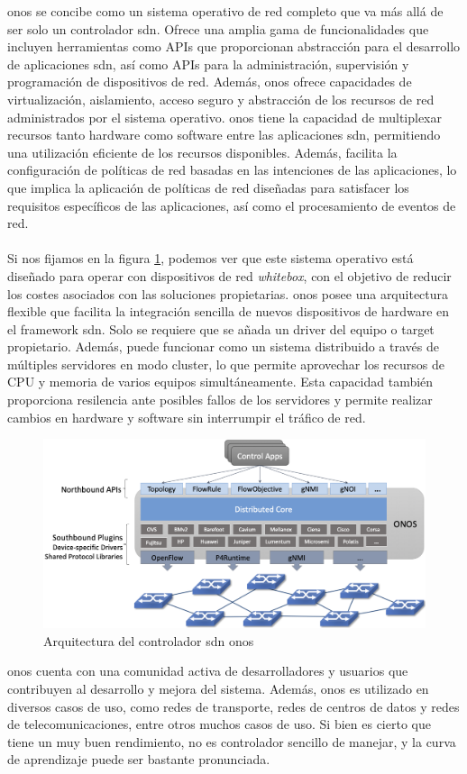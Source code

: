 \gls{onos} se concibe como un sistema operativo de red completo que va más allá de ser solo un controlador \gls{sdn}. Ofrece una amplia gama de funcionalidades que incluyen herramientas como APIs que proporcionan abstracción para el desarrollo de aplicaciones \gls{sdn}, así como APIs para la administración, supervisión y programación de dispositivos de red. Además, \gls{onos} ofrece capacidades de virtualización, aislamiento, acceso seguro y abstracción de los recursos de red administrados por el sistema operativo. \gls{onos} tiene la capacidad de multiplexar recursos tanto hardware como software entre las aplicaciones \gls{sdn}, permitiendo una utilización eficiente de los recursos disponibles. Además, facilita la configuración de políticas de red basadas en las intenciones de las aplicaciones, lo que implica la aplicación de políticas de red diseñadas para satisfacer los requisitos específicos de las aplicaciones, así como el procesamiento de eventos de red. \\
\\
Si nos fijamos en la figura \ref*{fig:onos}, podemos ver que este sistema operativo está diseñado para operar con dispositivos de red \textit{whitebox}, con el objetivo de reducir los costes asociados con las soluciones propietarias. \gls{onos} posee una arquitectura flexible que facilita la integración sencilla de nuevos dispositivos de hardware en el framework \gls{sdn}. Solo se requiere que se añada un driver del equipo o target propietario.  Además, puede funcionar como un sistema distribuido a través de múltiples servidores en modo cluster, lo que permite aprovechar los recursos de CPU y memoria de varios equipos simultáneamente. Esta capacidad también proporciona resilencia ante posibles fallos de los servidores y permite realizar cambios en hardware y software sin interrumpir el tráfico de red.

\begin{figure}[ht]
    \centering
    \includegraphics[width=\textwidth]{archivos/img/teoria/onos.png}
    \caption{Arquitectura del controlador \gls{sdn} onos \cite{ryu2}}
    \label{fig:onos}
\end{figure}

\gls{onos} cuenta con una comunidad activa de desarrolladores y usuarios que contribuyen al desarrollo y mejora del sistema. Además, \gls{onos} es utilizado en diversos casos de uso, como redes de transporte, redes de centros de datos y redes de telecomunicaciones, entre otros muchos casos de uso. Si bien es cierto que tiene un muy buen rendimiento, no es controlador sencillo de manejar, y la curva de aprendizaje puede ser bastante pronunciada.
